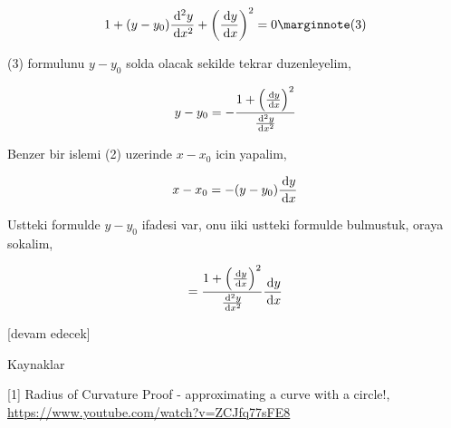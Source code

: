 \documentclass[12pt,fleqn]{article}\usepackage{../../common}
\begin{document}
$$
1 + (y-y_0) \frac{\ud^2y}{\ud x^2} +
\left( \frac{\ud y}{\ud x}  \right)^2 = 0
\mlabel{3}
$$

(3) formulunu $y-y_0$ solda olacak sekilde tekrar duzenleyelim,

$$
y-y_0 = - \frac{1 + \left( \frac{\,\mathrm{d} y}{\,\mathrm{d} x}  \right)^2}{\frac{\,\mathrm{d}^2y}{\,\mathrm{d} x^2}}
$$

Benzer bir islemi (2) uzerinde $x-x_0$ icin yapalim,

$$
x-x_0 = -(y-y_0)\frac{\,\mathrm{d} y}{\,\mathrm{d} x}
$$

Ustteki formulde $y-y_0$ ifadesi var, onu iiki ustteki formulde bulmustuk,
oraya sokalim,

$$
= \frac{1 + \left( \frac{\,\mathrm{d} y}{\,\mathrm{d} x}  \right)^2}{\frac{\,\mathrm{d}^2y}{\,\mathrm{d} x^2}}
\frac{\,\mathrm{d} y}{\,\mathrm{d} x}
$$

[devam edecek]

Kaynaklar

[1] Radius of Curvature Proof - approximating a curve with a circle!,
    \url{https://www.youtube.com/watch?v=ZCJfq77sFE8}
\end{document}
